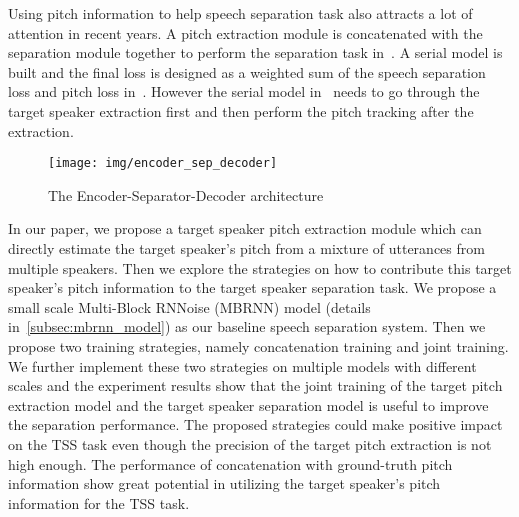 Using pitch information to help speech separation task also attracts a lot of attention in recent years.
A pitch extraction module is concatenated with the separation module together to perform the separation task in~\cite{pitch_aware}.
A serial model is built and the final loss is designed as a weighted sum of the speech separation loss and pitch loss in~\cite{serial}. However the serial model in~\cite{serial} needs to go through the target speaker extraction first and then perform the pitch tracking after the extraction.

\begin{figure}[!t]
    \centering
    \texttt{[image: img/encoder\_sep\_decoder]}
    \caption{The Encoder-Separator-Decoder architecture}
    \label{fig:enc_sep_doc_arc}
\end{figure}

In our paper, we propose a target speaker pitch extraction module which can directly estimate the target speaker's pitch from a mixture of utterances from multiple speakers.
Then we explore the strategies on how to contribute this target speaker's pitch information to the target speaker separation task.
We propose a small scale Multi-Block RNNoise (MBRNN) model (details in~\ref{subsec:mbrnn_model}) as our baseline speech separation system.
Then we propose two training strategies, namely concatenation training and joint training.
We further implement these two strategies on multiple models with different scales and the experiment results show that the joint training of the target pitch extraction model and the target speaker separation model is useful to improve the separation performance.
The proposed strategies could make positive impact on the TSS task even though the precision of the target pitch extraction is not high enough.
The performance of concatenation with ground-truth pitch information show great potential in utilizing the target speaker's pitch information for the TSS task.

